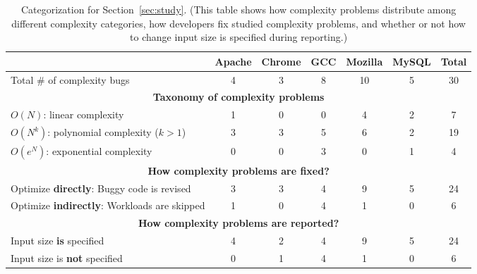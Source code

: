 \begin{table*}[tb!]
\begin{adjustwidth}{-.5in}{-.5in}
\small
\centering
{
\begin{tabular}{|lcccccc|}
\hline
                                                                                  &   Apache  &   Chrome   &  GCC   &    Mozilla   &   MySQL  &  Total\\
\hline
Total \# of complexity bugs                                                       &   4       &    3       &   8    &    10        &   5      &   30 \\
\hline
\multicolumn{7}{|c|}{\bf Taxonomy of complexity problems}\\
\multicolumn{1}{|l}{{\bf $O(N)$}: linear complexity}                              &   1       &    0       &   0    &    4         &   2      &   7\\
\multicolumn{1}{|l}{{\bf $O(N^k)$}: polynomial complexity ($k>1$)}                &   3       &    3       &   5    &    6         &   2      &  19\\
\multicolumn{1}{|l}{{\bf $O(e^N)$}: exponential complexity}                       &   0       &    0       &   3    &    0         &   1      &   4\\
\hline
\multicolumn{7}{|c|}{\bf How complexity problems are fixed?}\\
\multicolumn{1}{|l}{Optimize {\bf directly}: Buggy code is revised}              &  3        &    3       &   4    &    9         &   5      &  24 \\
\multicolumn{1}{|l}{Optimize {\bf indirectly}: Workloads are skipped}              &  1        &    0       &   4    &    1         &   0      &   6\\
\hline
\multicolumn{7}{|c|}{\bf How complexity problems are reported?}\\
\multicolumn{1}{|l}{Input size {\bf is} specified}                                &  4        &    2       &   4    &    9    &5   &24\\
\multicolumn{1}{|l}{Input size is {\bf not} specified}                            &  0        &    1       &   4    &    1    &0   &6\\
\hline
\end{tabular}
}
\end{adjustwidth}
\caption{Categorization for Section~\ref{sec:study}.
\footnotesize{(This table shows how complexity problems distribute among different complexity categories, how developers fix studied complexity problems,
 and whether or not how to change input size is specified during reporting.)}}
\label{tab:study}
\end{table*}
